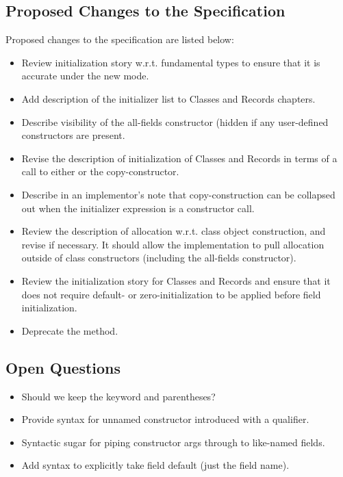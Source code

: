 \subsection{Proposed Changes to the Specification}
Proposed changes to the specification are listed below:
\begin{itemize}[itemsep=0pt]
\item Review initialization story w.r.t. fundamental types to ensure that it is accurate
  under the new mode.
\item Add description of the initializer list to Classes and Records chapters.
\item Describe visibility of the all-fields constructor (hidden if any user-defined
  constructors are present.
\item Revise the description of initialization of Classes and Records in terms of a call to
  either  or the copy-constructor.
\item Describe in an implementor's note that copy-construction can be collapsed out when
  the initializer expression is a constructor call.
\item Review the description of allocation w.r.t. class object construction, and revise if
  necessary.  It should allow the implementation to pull allocation outside of class
  constructors (including the all-fields constructor).
\item Review the initialization story for Classes and Records and ensure that it does not
  require default- or zero-initialization to be applied before field initialization.
\item Deprecate the  method.
\end{itemize}

\subsection{Open Questions}

\begin{itemize}[itemsep=0pt]
\item Should we keep the  keyword and parentheses?
\item Provide syntax for unnamed constructor introduced with a qualifier.
\item Syntactic sugar for piping constructor args through to like-named fields.
\item Add syntax to explicitly take field default (just the field name).
\end{itemize}


